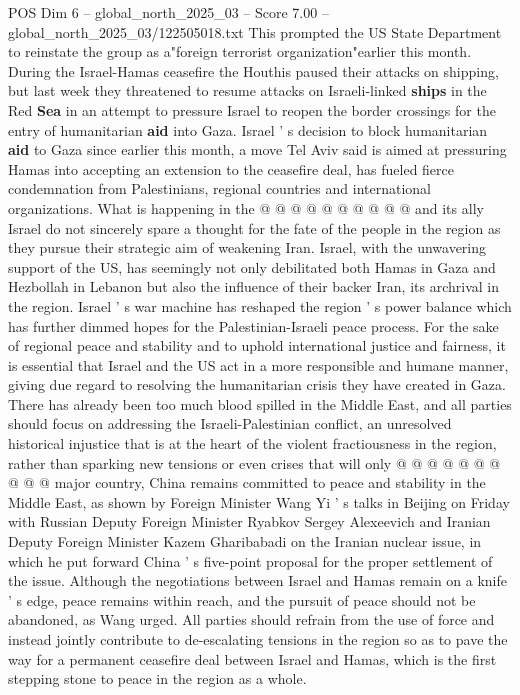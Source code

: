 \begin{textsample}{POS Dim 6 – global\_north\_2025\_03 – Score 7.00 – global\_north\_2025\_03/122505018.txt}
This prompted the US State Department to reinstate the group as a"foreign terrorist organization"earlier this month.
During the Israel-Hamas ceasefire the Houthis paused their attacks on shipping, but last week they threatened to resume attacks on Israeli-linked \textbf{ships} in the Red \textbf{Sea} in an attempt to pressure Israel to reopen the border crossings for the entry of humanitarian \textbf{aid} into Gaza.
Israel ' s decision to block humanitarian \textbf{aid} to Gaza since earlier this month, a move Tel Aviv said is aimed at pressuring Hamas into accepting an extension to the ceasefire deal, has fueled fierce condemnation from Palestinians, regional countries and international organizations.
What is happening in the @ @ @ @ @ @ @ @ @ @ and its ally Israel do not sincerely spare a thought for the fate of the people in the region as they pursue their strategic aim of weakening Iran.
Israel, with the unwavering support of the US, has seemingly not only debilitated both Hamas in Gaza and Hezbollah in Lebanon but also the influence of their backer Iran, its archrival in the region.
Israel ' s war machine has reshaped the region ' s power balance which has further dimmed hopes for the Palestinian-Israeli peace process.
For the sake of regional peace and stability and to uphold international justice and fairness, it is essential that Israel and the US act in a more responsible and humane manner, giving due regard to resolving the humanitarian crisis they have created in Gaza.
There has already been too much blood spilled in the Middle East, and all parties should focus on addressing the Israeli-Palestinian conflict, an unresolved historical injustice that is at the heart of the violent fractiousness in the region, rather than sparking new tensions or even crises that will only @ @ @ @ @ @ @ @ @ @ major country, China remains committed to peace and stability in the Middle East, as shown by Foreign Minister Wang Yi ' s talks in Beijing on Friday with Russian Deputy Foreign Minister Ryabkov Sergey Alexeevich and Iranian Deputy Foreign Minister Kazem Gharibabadi on the Iranian nuclear issue, in which he put forward China ' s five-point proposal for the proper settlement of the issue.
Although the negotiations between Israel and Hamas remain on a knife ' s edge, peace remains within reach, and the pursuit of peace should not be abandoned, as Wang urged.
All parties should refrain from the use of force and instead jointly contribute to de-escalating tensions in the region so as to pave the way for a permanent ceasefire deal between Israel and Hamas, which is the first stepping stone to peace in the region as a whole.

\end{textsample}
